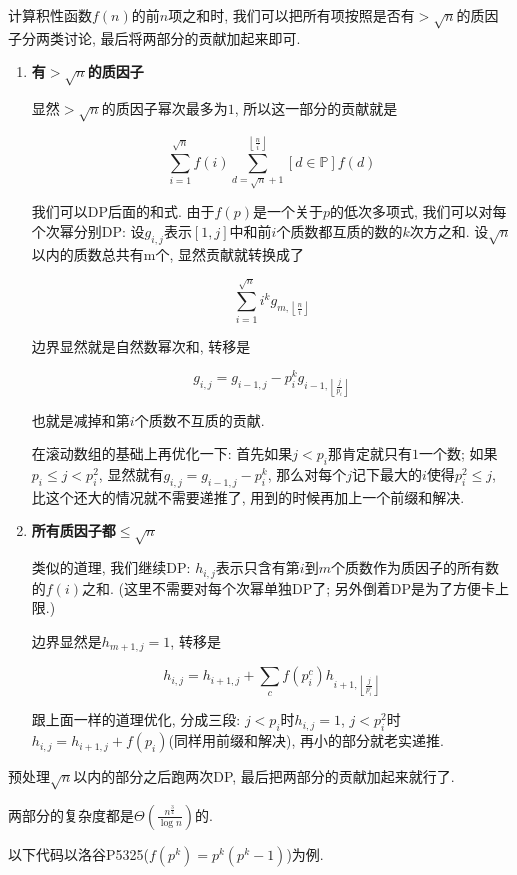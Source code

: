 计算积性函数$f(n)$的前$n$项之和时, 我们可以把所有项按照是否有$> \sqrt n$的质因子分两类讨论, 最后将两部分的贡献加起来即可.

\begin{enumerate}
	
\item \textbf{有$> \sqrt n$的质因子}

显然$> \sqrt n$的质因子幂次最多为$1$, 所以这一部分的贡献就是

$$ \sum_{i = 1} ^ {\sqrt n} f(i) \sum_{d = \sqrt n + 1} ^ {\left\lfloor \frac n i \right\rfloor} \left[ d \in \mathbb{P} \right] f(d) $$

我们可以DP后面的和式. 由于$f(p)$是一个关于$p$的低次多项式, 我们可以对每个次幂分别DP: 设$g_{i, j}$表示$[1, j]$中和前$i$个质数都互质的数的$k$次方之和. 设$\sqrt n$以内的质数总共有m个, 显然贡献就转换成了

$$ \sum_{i = 1} ^ {\sqrt n} i ^ k g_{m, \left\lfloor \frac n i \right\rfloor} $$

边界显然就是自然数幂次和, 转移是

$$ g_{i, j} = g_{i - 1, j} - p_i ^ k g_{i - 1, \left\lfloor \frac j {p_i} \right\rfloor} $$

也就是减掉和第$i$个质数不互质的贡献.

在滚动数组的基础上再优化一下: 首先如果$j < p_i$那肯定就只有$1$一个数; 如果$p_i \le j < p_i ^ 2$, 显然就有$g_{i, j} = g_{i - 1, j} - p_i ^ k$, 那么对每个$j$记下最大的$i$使得$p_i ^ 2 \le j$, 比这个还大的情况就不需要递推了, 用到的时候再加上一个前缀和解决.

\item \textbf{所有质因子都$\le \sqrt n$}

类似的道理, 我们继续DP: $h_{i, j}$表示只含有第$i$到$m$个质数作为质因子的所有数的$f(i)$之和. (这里不需要对每个次幂单独DP了; 另外倒着DP是为了方便卡上限.)

边界显然是$h_{m + 1, j} = 1$, 转移是

$$ h_{i, j} = h_{i + 1, j} + \sum_{c} f(p_i ^ c) h_{i + 1, \left\lfloor \frac j {p_i ^ c} \right\rfloor} $$

跟上面一样的道理优化, 分成三段: $j < p_i$时$h_{i, j} = 1$, $j < p_i ^ 2$时$h_{i, j} = h_{i + 1, j} + f(p_i)$(同样用前缀和解决), 再小的部分就老实递推.

\end{enumerate}

预处理$\sqrt n$以内的部分之后跑两次DP, 最后把两部分的贡献加起来就行了.

两部分的复杂度都是$\Theta \left( \frac {n ^ {\frac 3 4}} {\log n} \right)$的.

以下代码以洛谷P5325($f(p^k) = p^k (p^k - 1)$)为例.

\inputminted{cpp}{../src/numbertheory/洲阁筛.cpp}